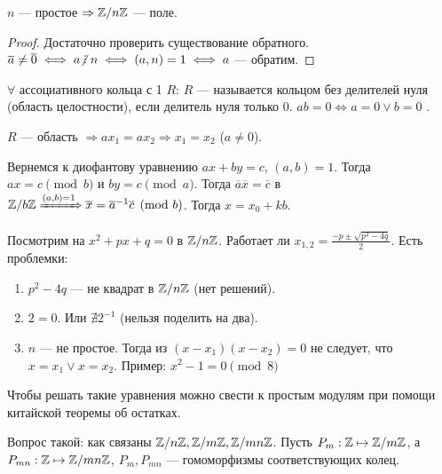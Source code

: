 \begin{consequence}
    $n$ --- простое  $\Rightarrow \mathbb{Z} / n\mathbb{Z}$ --- поле.
\end{consequence}
\begin{proof}
    Достаточно проверить существование обратного. $\overline{a} \neq \overline{0} \iff a \centernot\divby n \iff (a, n) = 1 \iff a$ --- обратим.
\end{proof}
\begin{definition}
    $\forall $ ассоциативного кольца с 1 $R$:  $R$ --- называется кольцом без делителей нуля (область целостности), если делитель нуля только 0.  $ab = 0 \iff a = 0 \lor b = 0$  .
\end{definition}
 \begin{remark}
     $R$ --- область  $\Rightarrow ax_1=ax_2 \Rightarrow x_1=x_2$ ($a \neq 0$).
\end{remark}
\slashn
Вернемся к диофантову уравнению $ax+by=c$, $(a, b) = 1$. Тогда $ax = c \pmod{b}$ и  $by = c \pmod{a}$. Тогда  $\overline{a}\overline{x}=\overline{c}$ в  $\mathbb{Z} / b\mathbb{Z} \xRightarrow{(a,b)=1} \overline{x} = \overline{a}^{-1}\overline{c} \pmod{b}$. Тогда $x = x_0+kb$.

Посмотрим на $x^2+px+q=0$ в  $\mathbb{Z} / n\mathbb{Z}$. Работает ли  $x_{1,2} = \frac{-p \pm \sqrt{p^2 - 4q}}{2}$. Есть проблемки:
 \begin{enumerate}
     \item $p^2 - 4q$ --- не квадрат в  $\mathbb{Z} / n\mathbb{Z}$ (нет решений).
     \item $2 = 0$. Или  $\nexists 2^{-1}$ (нельзя поделить на два).
     \item  $n$ --- не простое. Тогда из $(x-x_1)(x-x_2)=0$ не следует, что $x = x_1 \lor x = x_2$. Пример: $x^2-1=0 \pmod{8}$
\end{enumerate}
Чтобы решать такие уравнения можно свести к простым модулям при помощи китайской теоремы об остатках.

Вопрос такой: как связаны $\mathbb{Z} / n\mathbb{Z}, \mathbb{Z} / m\mathbb{Z}, \mathbb{Z} / mn\mathbb{Z}$. Пусть $P_m: \mathbb{Z} \mapsto \mathbb{Z} / m\mathbb{Z}$, а $P_{mn}: \mathbb{Z} \mapsto \mathbb{Z} / mn\mathbb{Z}$, $P_m, P_{mn}$ --- гомоморфизмы соответствующих колец. 

